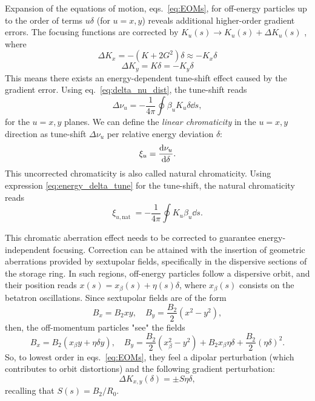 Expansion of the equations of motion, eqs.~\eqref{eq:EOMs}, for off-energy particles up to the order of terms $u\delta$ (for $u=x,y$) reveals additional higher-order gradient errors. The focusing functions are corrected by $K_u(s)\to K_u(s) + \Delta K_u(s)$ \cite{lee_accelerator_2004,huang_beam-based_2019}, where
\begin{equation}
    \Delta K_x = -(K+2G^2)\delta \approx - K_x\delta
\end{equation}
\begin{equation}
    \Delta K_y = K\delta = - K_y\delta
\end{equation}
This means there exists an energy-dependent tune-shift effect caused by the gradient error. Using eq.~\eqref{eq:delta_nu_dist}, the tune-shift reads
\begin{equation}
    \Delta \nu_u = - \frac{1}{4\pi}\oint\beta_u K_u \delta \dd{s},
    \label{eq:energy_delta_tune}
\end{equation}
for the $u=x,y$ planes. We can define the \textit{linear chromaticity} in the $u=x,y$ direction as tune-shift $\Delta \nu_u$ per relative energy deviation $\delta$:
\begin{equation}
    \xi_u=\dv{\nu_u}{\delta}.
\end{equation}
This uncorrected chromaticity is also called natural chromaticity. Using expression \eqref{eq:energy_delta_tune} for the tune-shift, the natural chromaticity reads
\begin{equation}
\xi_{u, \text {nat }} =-\frac{1}{4 \pi} \oint K_u \beta_u \dd{s}.
\end{equation}

This chromatic aberration effect needs to be corrected to guarantee energy-independent focusing. Correction can be attained with the insertion of geometric aberrations provided by sextupolar fields, specifically in the dispersive sections of the storage ring. In such regions, off-energy particles follow a dispersive orbit, and their position reads $x(s)=x_{\beta}(s)+\eta(s) \delta$, where $x_{\beta}(s)$ consists on the betatron oscillations. Since sextupolar fields are of the form
$$B_{x}=B_{2} x y, \quad B_{y}= \frac{B_{2}}{2}(x^{2}-y^{2}),$$
then, the off-momentum particles "see" the fields
$$B_{x}=B_{2}(x_\beta y + \eta \delta y), \quad B_{y}=\frac{B_{2}}{2}({x_\beta^{2}-y^{2}})+B_2 x_\beta \eta \delta + \frac{B_2}{2}(\eta \delta)^2.$$
So, to lowest order in eqs.~\eqref{eq:EOMs}, they feel a dipolar perturbation (which contributes to orbit distortions) and the following gradient perturbation:
$$\Delta K_{x,y}(\delta)=\pm S\eta \delta,$$
recalling that $S(s) = B_2 / R_0$.

